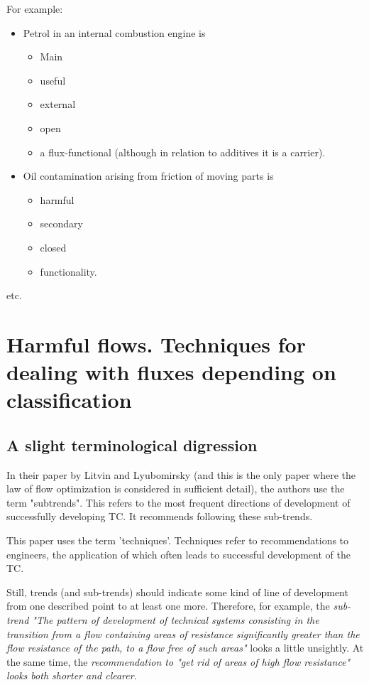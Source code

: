 \documentclass[a4paper,11pt]{article}
\begin{document}
For example:
\begin{itemize}
\item Petrol in an internal combustion engine is
  \begin{itemize}
  \item Main
  \item useful
  \item external
  \item open
  \item a flux-functional (although in relation to additives it is a carrier).
  \end{itemize}
\item Oil contamination arising from friction of moving parts is
  \begin{itemize}
  \item harmful
  \item secondary
  \item closed
  \item functionality.
  \end{itemize}
\end{itemize}
etc.

\section{Harmful flows. Techniques for dealing with fluxes depending on
  classification}

\subsection{A slight terminological digression}

In their paper by Litvin and Lyubomirsky (and this is the only paper where the
law of flow optimization is considered in sufficient detail), the authors use
the term "subtrends". This refers to the most frequent directions of
development of successfully developing TC. It recommends following these
sub-trends.

This paper uses the term 'techniques'. Techniques refer to recommendations to
engineers, the application of which often leads to successful development of
the TC.

Still, trends (and sub-trends) should indicate some kind of line of
development from one described point to at least one more. Therefore, for
example, the \emph{sub-trend "The pattern of development of technical systems
  consisting in the transition from a flow containing areas of resistance
  significantly greater than the flow resistance of the path, to a flow free
  of such areas"} looks a little unsightly. At the same time, the
\emph{recommendation to "get rid of areas of high flow resistance" looks both
  shorter and clearer}.
\end{document}
